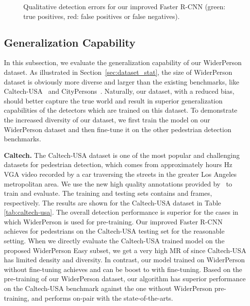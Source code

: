 \documentclass[journal]{IEEEtran}
\begin{document}
\begin{figure*}[t]
\centering
{}
\caption{Qualitative detection errors for our improved Faster R-CNN (green: true positives, red: false positives or false negatives).}
\label{fig:qualitative_mistakes}
\end{figure*}

\subsection{Generalization Capability}
In this subsection, we evaluate the generalization capability of our WiderPerson dataset. As illustrated in Section~\ref{sec:dataset_stat}, the size of WiderPerson dataset is obviously more diverse and larger than the existing benchmarks, like Caltech-USA~\cite{DBLP:journals/pami/DollarWSP12} and CityPersons~\cite{DBLP:conf/cvpr/ZhangBS17}. Naturally, our dataset, with a reduced bias, should better capture the true world and result in superior generalization capabilities of the detectors which are trained on this dataset. To demonstrate the increased diversity of our dataset, we first train the model on our WiderPerson dataset and then fine-tune it on the other pedestrian detection benchmarks.

{\flushleft \textbf{Caltech. }}
The Caltech-USA dataset is one of the most popular and challenging datasets for pedestrian detection, which comes from approximately  hours Hz VGA video recorded by a car traversing the streets in the greater Los Angeles metropolitan area. We use the new high quality annotations provided by~\cite{DBLP:conf/cvpr/ZhangBOHS16} to train and evaluate. The training and testing sets contains  and  frames, respectively. The results are shown for the Caltech-USA dataset in Table \ref{tab:caltech-usa}. The overall detection performance is superior for the cases in which WiderPerson is used for pre-training. Our improved Faster R-CNN achieves   for pedestrians on the Caltech-USA testing set for the reasonable setting. When we directly evaluate the Caltech-USA trained model on the proposed WiderPerson Easy subset, we get a very high MR of  since Caltech-USA has limited density and diversity. In contrast, our model trained on WiderPerson without fine-tuning achieves   and can be boost to   with fine-tuning. Based on the pre-training of our WiderPerson dataset, our algorithm has superior performance on the Caltech-USA benchmark against the one without WiderPerson pre-training, and performs on-pair with the state-of-the-arts.
\end{document}
